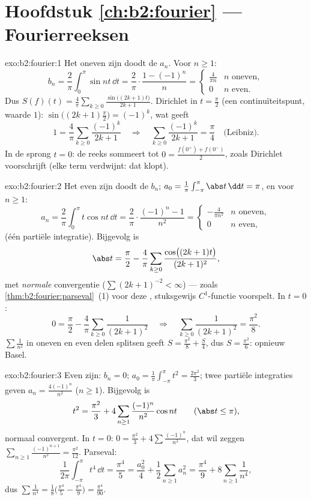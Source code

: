 \section*{Hoofdstuk \ref{ch:b2:fourier} --- Fourierreeksen}

\begin{solution}{exo:b2:fourier:1}
Het oneven zijn doodt de $a_n$. Voor $n \geq 1$:
\[
b_n = \frac{2}{\pi}\int_0^{\pi} \sin nt\,\dd t
= \frac{2}{\pi}\cdot\frac{1 - (-1)^n}{n}
= \begin{cases} \frac{4}{\pi n} & n \text{ oneven},\\ 0 & n
\text{ even}. \end{cases}
\]
Dus $S(f)(t) = \frac{4}{\pi}\sum_{k\geq0} \frac{\sin\bigl((2k+1)t
\bigr)}{2k+1}$. Dirichlet in $t = \frac\pi2$ (een
continuïteitspunt, waarde $1$): $\sin\bigl((2k+1)\frac\pi2\bigr) =
(-1)^k$, wat geeft
\[
1 = \frac4\pi \sum_{k\geq0}\frac{(-1)^k}{2k+1}
\quad\Longrightarrow\quad
\sum_{k\geq0}\frac{(-1)^k}{2k+1} = \frac{\pi}{4}
\quad\text{(Leibniz)}.
\]
In de sprong $t = 0$: de reeks sommeert tot $0 = \frac{f(0^+) +
f(0^-)}{2}$, zoals Dirichlet voorschrijft (elke term verdwijnt: dat
klopt).
\end{solution}

\begin{solution}{exo:b2:fourier:2}
Het even zijn doodt de $b_n$; $a_0 =
\frac{1}{\pi}\int_{-\pi}^\pi\abs t\,\dd t = \pi$, en voor $n \geq
1$:
\[
a_n = \frac{2}{\pi}\int_0^\pi t\cos nt\,\dd t
= \frac{2}{\pi}\cdot\frac{(-1)^n - 1}{n^2}
= \begin{cases} -\frac{4}{\pi n^2} & n \text{ oneven},\\ 0 & n
\text{ even}, \end{cases}
\]
(één partiële integratie). Bijgevolg is
\[
\abs t = \frac{\pi}{2} - \frac{4}{\pi}\sum_{k\geq0}
\frac{\cos\bigl((2k+1)t\bigr)}{(2k+1)^2} ,
\]
met \emph{normale} convergentie ($\sum (2k+1)^{-2} < \infty$) ---
zoals \cref{thm:b2:fourier:parseval}~(1) voor deze ,
stuksgewijs $C^1$-functie voorspelt. In $t = 0$:
\[
0 = \frac\pi2 - \frac4\pi\sum_{k\geq0}\frac{1}{(2k+1)^2}
\quad\Longrightarrow\quad
\sum_{k\geq0}\frac{1}{(2k+1)^2} = \frac{\pi^2}{8} .
\]
$\sum \frac{1}{n^2}$ in oneven en even delen splitsen geeft $S =
\frac{\pi^2}{8} + \frac S4$, dus $S = \frac{\pi^2}{6}$: opnieuw
Basel.
\end{solution}

\begin{solution}{exo:b2:fourier:3}
Even zijn: $b_n = 0$; $a_0 = \frac{1}{\pi}\int_{-\pi}^{\pi} t^2 =
\frac{2\pi^2}{3}$; twee partiële integraties geven $a_n =
\frac{4(-1)^n}{n^2}$ ($n \geq 1$). Bijgevolg is
\[
t^2 = \frac{\pi^2}{3} + 4\sum_{n\geq1}
\frac{(-1)^n}{n^2}\cos nt
\qquad (\abs t \leq \pi),
\]
normaal convergent. In $t = 0$: $0 = \frac{\pi^2}{3} +
4\sum\frac{(-1)^n}{n^2}$, dat wil zeggen $\sum_{n\geq1}
\frac{(-1)^{n+1}}{n^2} = \frac{\pi^2}{12}$. Parseval:
\[
\frac{1}{2\pi}\int_{-\pi}^{\pi} t^4\,\dd t = \frac{\pi^4}{5}
= \frac{a_0^2}{4} + \frac12\sum_{n\geq1} a_n^2
= \frac{\pi^4}{9} + 8\sum_{n\geq1}\frac{1}{n^4} ,
\]
dus $\sum \frac{1}{n^4} = \frac18\bigl(\frac{\pi^4}{5} -
\frac{\pi^4}{9}\bigr) = \frac{\pi^4}{90}$.
\end{solution}

